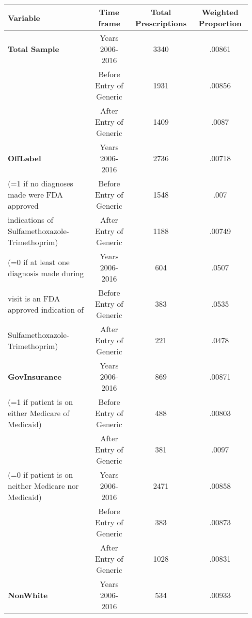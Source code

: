 \begin{tabular}{l*{3}{c}}
\hline\hline
            Variable&\multicolumn{1}{c}{Time frame}&\multicolumn{1}{c}{Total Prescriptions}&\multicolumn{1}{c}{Weighted Proportion}\\
\hline
\textbf{Total Sample}                                   &     Years 2006-2016&                          3340&     .00861\\
                                                        &     Before Entry of Generic&    1931&     .00856\\
                                                        &     After Entry of Generic&      1409&     .0087\\
[1em]
\textbf{OffLabel}                                       &     Years 2006-2016&             2736&     .00718\\
(=1 if no diagnoses made were FDA approved         &     Before Entry of Generic&    1548&     .007\\
indications of Sulfamethoxazole-Trimethoprim)  &     After Entry of Generic&      1188&     .00749\\
[.5em]
(=0 if at least one diagnosis made during               &     Years 2006-2016&             604&     .0507\\
visit is an FDA approved indication of                  &     Before Entry of Generic&    383&     .0535\\
Sulfamethoxazole-Trimethoprim)                          &     After Entry of Generic&      221&     .0478\\
[.5em]
\textbf{GovInsurance}                                   &     Years 2006-2016&             869&     .00871\\
(=1 if patient is on either Medicare of Medicaid)       &     Before Entry of Generic&     488 &     .00803\\
                                                        &     After Entry of Generic&      381 &     .0097\\
[.5em]
(=0 if patient is on neither Medicare nor Medicaid)     &     Years 2006-2016&             2471&     .00858\\
                                                        &     Before Entry of Generic&     383 &     .00873\\
                                                        &     After Entry of Generic&      1028 &     .00831\\
[.5em]
\textbf{NonWhite}                                       &     Years 2006-2016&             534&      .00933\\

\end{tabular}
